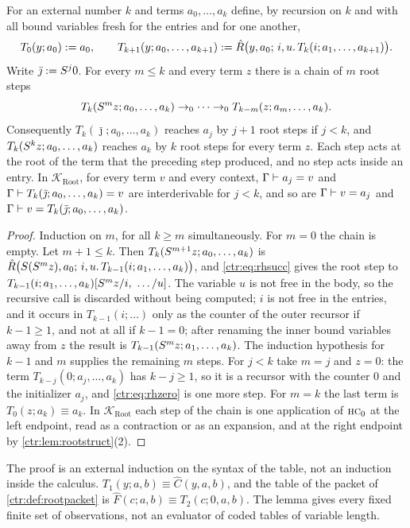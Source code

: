 \begin{lemma}\label{ctr:lem:roottable}
For an external number $k$ and terms $a_0,\dots,a_k$ define, by recursion on $k$ and with all
bound variables fresh for the entries and for one another,
\[
 T_0(y;a_0)\mathrel{:=} a_0,\qquad
 T_{k+1}(y;a_0,\dots,a_{k+1})\mathrel{:=}\hat R\bigl(y,a_0;\,i,u.\,T_k(i;a_1,\dots,a_{k+1})\bigr).
\]
Write $\bar\jmath\mathrel{:=}S^j0$. For every $m\le k$ and every term $z$ there is a chain of
$m$ root steps
\[
 T_k(S^mz;a_0,\dots,a_k)\to_0\cdots\to_0 T_{k-m}(z;a_m,\dots,a_k).
\]
Consequently $T_k(\bar\jmath;a_0,\dots,a_k)$ reaches $a_j$ by $j+1$ root steps if $j<k$, and
$T_k(S^kz;a_0,\dots,a_k)$ reaches $a_k$ by $k$ root steps for every term $z$. Each step acts
at the root of the term that the preceding step produced, and no step acts inside an entry.
In $\mathcal K_{\mathrm{Root}}$, for every term $v$ and every context, $\Gamma\vdash a_j=v$
and $\Gamma\vdash T_k(\bar\jmath;a_0,\dots,a_k)=v$ are interderivable for $j<k$, and so are
$\Gamma\vdash v=a_j$ and $\Gamma\vdash v=T_k(\bar\jmath;a_0,\dots,a_k)$.
\end{lemma}
\begin{proof}
Induction on $m$, for all $k\ge m$ simultaneously. For $m=0$ the chain is empty. Let
$m+1\le k$. Then $T_k(S^{m+1}z;a_0,\dots,a_k)$ is
$\hat R\bigl(S(S^mz),a_0;\,i,u.\,T_{k-1}(i;a_1,\dots,a_k)\bigr)$, and
\eqref{ctr:eq:rhsucc} gives the root step to
$T_{k-1}(i;a_1,\dots,a_k)[\Suc^mz/i,\ \ldots/u]$. The variable $u$ is not free in the body,
so the recursive call is discarded without being computed; $i$ is not free in the entries, and
it occurs in $T_{k-1}(i;\dots)$ only as the counter of the outer recursor if $k-1\ge 1$, and not
at all if $k-1=0$; after renaming the inner bound variables away from $z$ the result is
$T_{k-1}(S^mz;a_1,\dots,a_k)$. The induction hypothesis for $k-1$ and $m$ supplies the
remaining $m$ steps. For $j<k$ take $m=j$ and $z=0$: the term
$T_{k-j}(0;a_j,\dots,a_k)$ has $k-j\ge1$, so it is a recursor with the counter $0$ and the
initializer $a_j$, and \eqref{ctr:eq:rhzero} is one more step. For $m=k$ the last term is
$T_0(z;a_k)\equiv a_k$. In $\mathcal K_{\mathrm{Root}}$ each step of the chain is one
application of $\rulename{HC}_0$ at the left endpoint, read as a contraction or as an
expansion, and at the right endpoint by \cref{ctr:lem:rootstruct}(2).
\end{proof}

The proof is an external induction on the syntax of the table, not an induction inside the
calculus. $T_1(y;a,b)\equiv\hat C(y,a,b)$, and the table of the packet of
\cref{ctr:def:rootpacket} is $\hat F(c;a,b)\equiv T_2(c;0,a,b)$. The lemma gives every fixed
finite set of observations, not an evaluator of coded tables of variable length.

